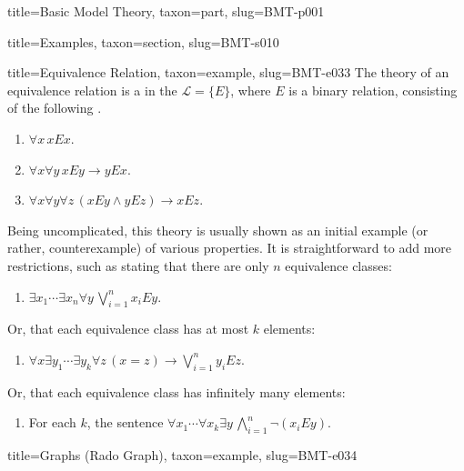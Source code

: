 \documentclass[a4paper]{article}
\begin{document}
\begin{tree}{title={Basic Model Theory}, taxon={part}, slug={BMT-p001}}
\begin{tree}{title={Examples}, taxon={section}, slug={BMT-s010}}
\begin{tree}{title={Equivalence Relation}, taxon={example}, slug={BMT-e033}}
    The theory of an equivalence relation is a  in the  \(\mathcal  L= \{ E \}\),
    where \(E\) is a binary relation, consisting of the following .
    \begin{enumerate}
\item{\(\forall  x \, xEx\).
        }
        \item{\(\forall  x \forall  y \, xEy \rightarrow  yEx\).
        }
        \item{\(\forall  x \forall  y \forall  z \, (xEy \land  yEz) \rightarrow  xEz\).
        }
\end{enumerate}\par{
    Being uncomplicated, this theory is usually shown as an initial example (or rather, counterexample) of various properties.
    It is straightforward to add more restrictions, such as stating that there are only \(n\) equivalence classes:
    \begin{enumerate}
\item{\(\exists  x_1 \cdots \exists  x_n \forall  y \, \bigvee _{i=1}^nx_iEy\).
        }
\end{enumerate}
    Or, that each equivalence class has at most \(k\) elements:
    \begin{enumerate}
\item{\(\forall  x \exists  y_1 \cdots \exists  y_k \forall  z \, (x=z) \rightarrow \bigvee _{i=1}^ny_iEz\).
        }
\end{enumerate}
    Or, that each equivalence class has infinitely many elements:
    \begin{enumerate}
\item{
            For each \(k\), the sentence \(\forall  x_1 \cdots \forall  x_k \exists  y \, \bigwedge _{i=1}^n \neg (x_iEy)\).
        }
\end{enumerate}}
\end{tree}

\begin{tree}{title={Graphs (Rado Graph)}, taxon={example}, slug={BMT-e034}}


\end{tree}
\end{tree}
\end{tree}
\end{document}

